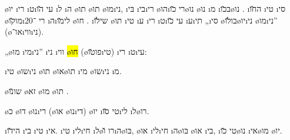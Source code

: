 \o{יו} \i{רי} \i{ט}\i{עי} \u{הו} \i{ל} \i{ה} \o{תו} \o{תו} \o{מו}\i{ני}, \i{בּי}  \i{בי}\i{רי} \o{הו}\i{רי} \u{כו}\o{נו}   \o{נו} \i{מ} \i{ב}\u{כו}\o{נו} . \i{ה}\u{חו} \i{טי} \i{סי} \o{מו}\u{קו}\i{רי}  ־20 \i{ה}\i{לי}\u{מו}  \o{חו} . \i{שי}\u{לו} \o{תו} \i{טי} \i{ע} \i{רי} \i{ט}\i{עי} \u{כו} \i{ע}\i{תי} „\i{סי} \o{בו}\u{לו}\o{יו}\i{ני} \o{מו}\i{ני}” (\o{או}־\i{ווי}\i{ני}).




„\o{מו} \i{מי}\i{ני}” \i{ני} \i{ווי}  \hl{ \o{חו}} (\o{פו}\u{טו}\i{טי})  \i{רי} \i{ט}\i{עי}:

\begin{compactenum}
\item {}\i{טי} \o{שו}\i{ני} \o{תו} \o{או}\o{תו} \i{מי} \o{שו}\i{ני}  \i{מ}.
\item {} \o{שו}\u{נו} \o{זא} \o{מו} \o{תו} .
\item {}\o{כ} \o{דו} \o{נו}\i{רי} (\o{או} \o{נו}\i{די}) \o{יו} \i{טי}  \u{סו}\i{לי} \i{ל}\o{רו}.
\item {}\i{הי}\u{דו} \i{בי}  \i{טי}  \i{אי}. \i{טי} \i{לי}\i{חי} \i{ל}\o{רו} \u{ו}\i{ה}\o{בּו}, \o{או}  \i{לי}\i{חי} \i{ה}\o{בּו} \o{או} \i{בי},  \i{טי}  \u{כו}\o{נו} \i{אי}\o{מו} \o{יו}.
\end{compactenum}

